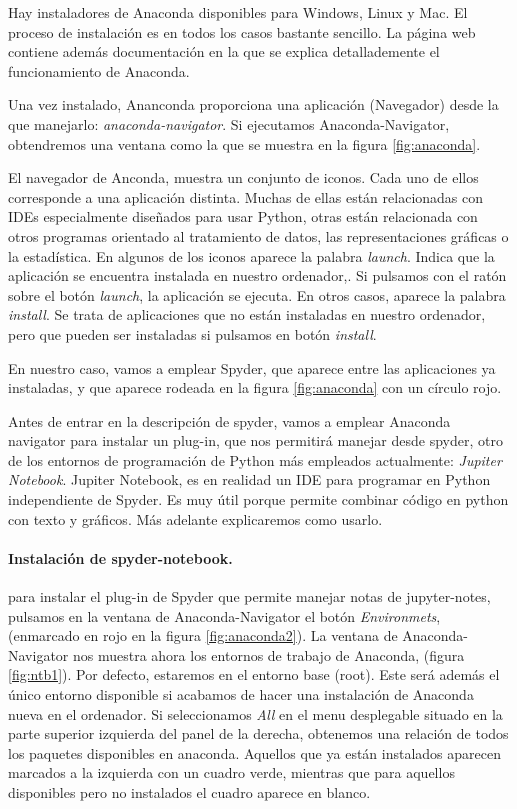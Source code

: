 \begin{paracol}{2}
 Hay instaladores de Anaconda disponibles para Windows, Linux y Mac. El proceso de instalación es en todos los casos bastante sencillo. La página web contiene además documentación en la que se explica detallademente el funcionamiento de Anaconda.

 Una vez instalado, Ananconda proporciona una aplicación (Navegador) desde la que manejarlo: \emph{anaconda-navigator}. Si ejecutamos Anaconda-Navigator, obtendremos una ventana como la que se muestra en la figura \ref{fig:anaconda}.

 El navegador de Anconda, muestra un conjunto de iconos. Cada uno de ellos corresponde a una aplicación distinta. Muchas de ellas están relacionadas con IDEs especialmente diseñados para usar Python, otras están relacionada con otros programas orientado al tratamiento de datos, las representaciones gráficas o la estadística. En algunos de los iconos aparece la palabra \emph{launch}. Indica que la aplicación se encuentra instalada en nuestro ordenador,. Si pulsamos con el ratón sobre el botón \emph{launch}, la aplicación se ejecuta. En otros casos, aparece la palabra \emph{install}. Se trata de aplicaciones que no están instaladas en nuestro ordenador, pero que pueden ser instaladas si pulsamos en botón \emph{install}. 

 En nuestro caso, vamos a emplear Spyder, que aparece entre las aplicaciones ya instaladas, y que aparece rodeada en la figura \ref{fig:anaconda} con un círculo rojo.

 Antes de entrar en la descripción de spyder, vamos a emplear Anaconda navigator para instalar un plug-in, que nos permitirá manejar desde spyder, otro de los entornos de programación de Python más empleados actualmente: \emph{Jupiter Notebook}. Jupiter Notebook, es en realidad un IDE para programar en Python independiente de Spyder. Es muy útil porque permite combinar código en python con texto y gráficos. Más adelante explicaremos como usarlo.

 \paragraph{Instalación de spyder-notebook.} para instalar el plug-in de Spyder que permite manejar notas de jupyter-notes, pulsamos en la ventana de Anaconda-Navigator el botón \emph{Environmets}, (enmarcado en rojo en la figura \ref{fig:anaconda2}). La ventana de Anaconda-Navigator nos muestra ahora los entornos de trabajo de Anaconda, (figura \ref{fig:ntb1}). Por defecto, estaremos en el entorno base (root). Este será además el único entorno disponible si acabamos de hacer una instalación de Anaconda nueva en el ordenador. Si seleccionamos \emph{All} en el menu desplegable situado en la parte superior izquierda del panel de la derecha,  obtenemos una relación de todos los paquetes disponibles en anaconda. Aquellos que ya están instalados aparecen marcados a la izquierda con un cuadro verde, mientras que para aquellos disponibles pero no instalados el cuadro aparece en blanco.


\end{paracol}

